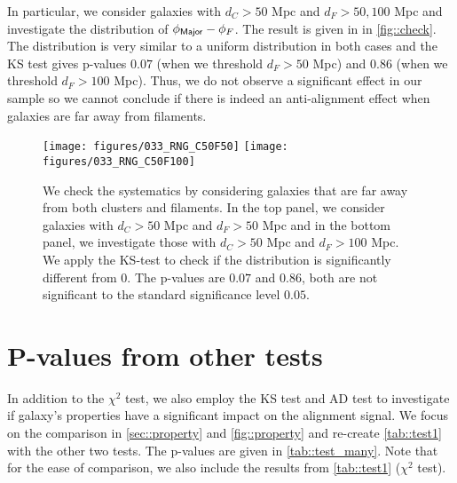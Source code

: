 \documentclass[usenatbib,useAMS]{mnras}
\theoremstyle{remark}
\begin{document}
{{{{{%
In particular, we consider galaxies with $d_C>50$ Mpc
and $d_F> 50, 100$ Mpc
and investigate the distribution of $\phi_{\sf Major}-\phi_{F}$.
The result is given in
in \autoref{fig::check}.
The distribution is very similar to a uniform distribution in both cases
and the KS test gives p-values $0.07$ (when we threshold $d_F>50$ Mpc) and $0.86$ 
(when we threshold $d_F>100$ Mpc). 
Thus, we do not observe a significant effect in our sample
so we cannot conclude if there is indeed an anti-alignment effect when galaxies are far away from filaments. 







\begin{figure*}
\center
\texttt{[image: figures/033\_RNG\_C50F50]}
\texttt{[image: figures/033\_RNG\_C50F100]}
\caption{
We check the systematics by considering galaxies that are far away from both clusters and filaments.
In the top panel, we consider galaxies with $d_C>50$ Mpc and $d_F>50$ Mpc
and in the bottom panel, we investigate those with $d_C>50$ Mpc and $d_F>100$ Mpc. 
We apply the KS-test to check if the distribution is significantly different from $0$. 
The p-values are $0.07$ and $0.86$, both are not significant to the standard significance level $0.05$.
}
\label{fig::check}
\end{figure*}





\section{P-values from other tests}	\label{sec::other}

In addition to the $\chi^2$ test, we also employ
the KS test and AD test 
to investigate if galaxy's properties have a significant impact on the alignment signal. 
We focus on the comparison in \autoref{sec::property} and \autoref{fig::property}
and
re-create \autoref{tab::test1} with the other two tests.
The p-values are given in \autoref{tab::test_many}. 
Note that for the ease of comparison, we also include the results from \autoref{tab::test1} ($\chi^2$ test).

}}}}}
\end{document}
